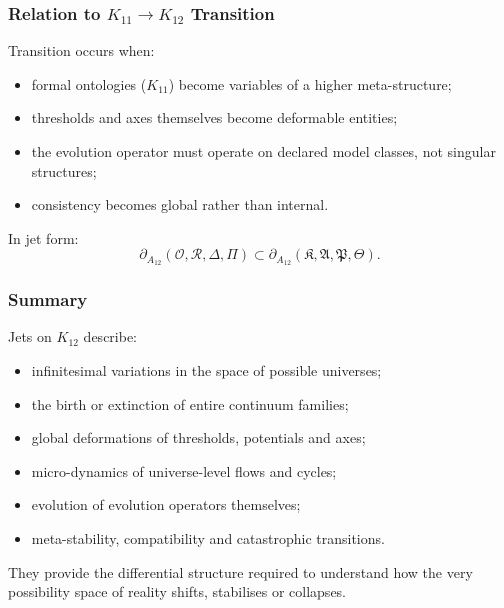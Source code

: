 \subsubsection{Relation to $K_{11} \to K_{12}$ Transition}

Transition occurs when:
\begin{itemize}
    \item formal ontologies ($K_{11}$) become variables of a higher
          meta-structure;
    \item thresholds and axes themselves become deformable entities;
    \item the evolution operator must operate on declared model classes,
          not singular structures;
    \item consistency becomes global rather than internal.
\end{itemize}

In jet form:
\[
\partial_{A_{12}}(\mathcal{O},\mathcal{R},\Delta,\Pi)
\subset
\partial_{A_{12}}(\mathfrak{K},\mathfrak{A},\mathfrak{P},\mathfrak{\Theta}).
\]


\subsubsection{Summary}

Jets on $K_{12}$ describe:
\begin{itemize}
    \item infinitesimal variations in the space of possible universes;
    \item the birth or extinction of entire continuum families;
    \item global deformations of thresholds, potentials and axes;
    \item micro-dynamics of universe-level flows and cycles;
    \item evolution of evolution operators themselves;
    \item meta-stability, compatibility and catastrophic transitions.
\end{itemize}

They provide the differential structure required to understand how the
very possibility space of reality shifts, stabilises or collapses.
